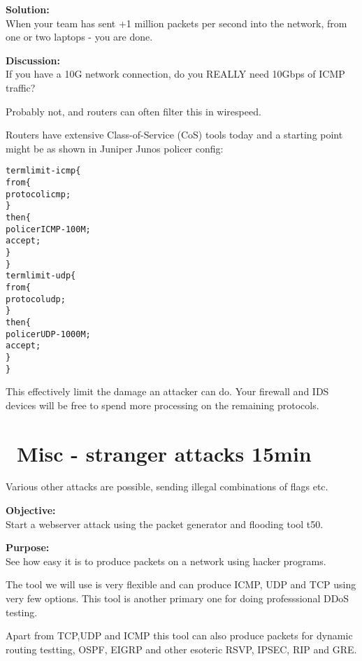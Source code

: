 \documentclass[a4paper,11pt,notitlepage]{report}
\begin{document}
{\bf Solution:}\\
When your team has sent +1 million packets per second into the network, from one or two laptops - you are done.

{\bf Discussion:}\\
If you have a 10G network connection, do you REALLY need 10Gbps of ICMP traffic?

Probably not, and routers can often filter this in wirespeed.

Routers have extensive Class-of-Service (CoS) tools today and a starting point might be as shown in Juniper Junos policer config:

\begin{alltt}\footnotesize
term limit-icmp \{
    from \{
        protocol icmp;
    \}
    then \{
        policer ICMP-100M;
        accept;
    \}
\}
term limit-udp \{
    from \{
        protocol udp;
    \}
    then \{
        policer UDP-1000M;
        accept;
    \}
\}
\end{alltt}

This effectively limit the damage an attacker can do. Your firewall and IDS devices will be free to spend more processing on the remaining protocols.



\chapter{\faInfoCircle\ Misc - stranger attacks 15min}

Various other attacks are possible, sending illegal combinations of flags etc.



{\bf Objective:}\\
Start a webserver attack using the packet generator and flooding tool t50.

{\bf Purpose:}\\
See how easy it is to produce packets on a network using hacker programs.

The tool we will use is very flexible and can produce ICMP, UDP and TCP using very few options. This tool is another primary one for doing professsional DDoS testing.

Apart from TCP,UDP and ICMP this tool can also produce packets for dynamic routing testting, OSPF, EIGRP and other esoteric RSVP, IPSEC, RIP and GRE.
\end{document}
